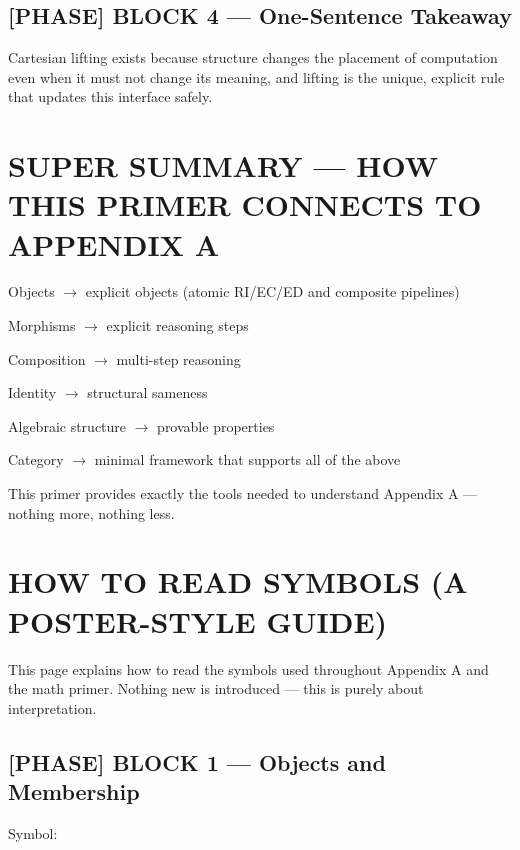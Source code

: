 \subsection*{[PHASE] BLOCK 4 --- One-Sentence Takeaway}

Cartesian lifting exists because structure changes the placement of computation even when it must not change its meaning, and lifting is the unique, explicit rule that updates this interface safely.\par

\section*{SUPER SUMMARY --- HOW THIS PRIMER CONNECTS TO APPENDIX A}

Objects $\to$ explicit objects (atomic RI/EC/ED and composite pipelines)\par

Morphisms $\to$ explicit reasoning steps\par

Composition $\to$ multi-step reasoning\par

Identity $\to$ structural sameness\par

Algebraic structure $\to$ provable properties\par

Category $\to$ minimal framework that supports all of the above\par

 This primer provides exactly the tools needed to understand Appendix A --- nothing more, nothing less.\par

\section*{HOW TO READ SYMBOLS (A POSTER-STYLE GUIDE)}

This page explains how to read the symbols used throughout Appendix A and the math primer. Nothing new is introduced --- this is purely about interpretation.\par

\subsection*{[PHASE] BLOCK 1 --- Objects and Membership}

Symbol:\par

